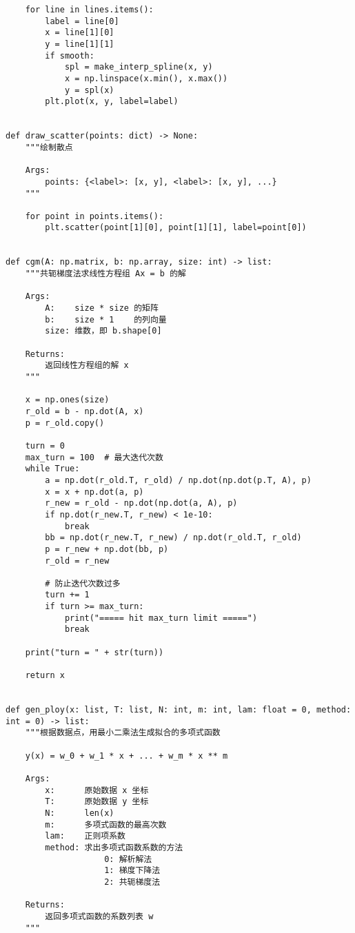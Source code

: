 \begin{verbatim}
    for line in lines.items():
        label = line[0]
        x = line[1][0]
        y = line[1][1]
        if smooth:
            spl = make_interp_spline(x, y)
            x = np.linspace(x.min(), x.max())
            y = spl(x)
        plt.plot(x, y, label=label)


def draw_scatter(points: dict) -> None:
    """绘制散点

    Args:
        points: {<label>: [x, y], <label>: [x, y], ...}
    """

    for point in points.items():
        plt.scatter(point[1][0], point[1][1], label=point[0])


def cgm(A: np.matrix, b: np.array, size: int) -> list:
    """共轭梯度法求线性方程组 Ax = b 的解

    Args:
        A:    size * size 的矩阵
        b:    size * 1    的列向量
        size: 维数，即 b.shape[0]

    Returns:
        返回线性方程组的解 x
    """

    x = np.ones(size)
    r_old = b - np.dot(A, x)
    p = r_old.copy()

    turn = 0
    max_turn = 100  # 最大迭代次数
    while True:
        a = np.dot(r_old.T, r_old) / np.dot(np.dot(p.T, A), p)
        x = x + np.dot(a, p)
        r_new = r_old - np.dot(np.dot(a, A), p)
        if np.dot(r_new.T, r_new) < 1e-10:
            break
        bb = np.dot(r_new.T, r_new) / np.dot(r_old.T, r_old)
        p = r_new + np.dot(bb, p)
        r_old = r_new

        # 防止迭代次数过多
        turn += 1
        if turn >= max_turn:
            print("===== hit max_turn limit =====")
            break

    print("turn = " + str(turn))

    return x


def gen_ploy(x: list, T: list, N: int, m: int, lam: float = 0, method: int = 0) -> list:
    """根据数据点，用最小二乘法生成拟合的多项式函数

    y(x) = w_0 + w_1 * x + ... + w_m * x ** m

    Args:
        x:      原始数据 x 坐标
        T:      原始数据 y 坐标
        N:      len(x)
        m:      多项式函数的最高次数
        lam:    正则项系数
        method: 求出多项式函数系数的方法
                    0: 解析解法
                    1: 梯度下降法
                    2: 共轭梯度法

    Returns:
        返回多项式函数的系数列表 w
    """


\end{verbatim}
